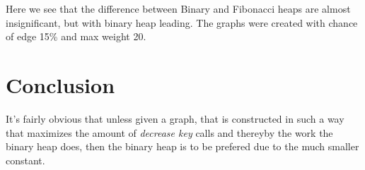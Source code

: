 Here we see that the difference between Binary and Fibonacci heaps are almost insignificant, but with binary heap leading. The graphs were created with chance of edge 15\% and max weight 20.
\section*{Conclusion}
It's fairly obvious that unless given a graph, that is constructed in such a way that maximizes the amount of \textit{decrease key} calls and thereyby the work the binary heap does, then the binary heap is to be prefered due to the much smaller constant.